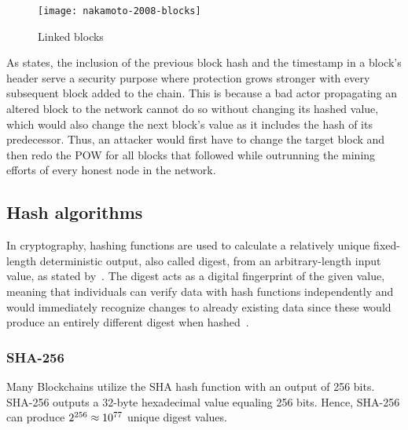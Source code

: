 \begin{figure}[h]
    \texttt{[image: nakamoto-2008-blocks]}
    \caption[Linked blocks]{Linked blocks~\autocite{nakamoto_bitcoin_2008}}
    \label{fig:prev-block-hash}
\end{figure}

As \textcite[2-3]{nakamoto_bitcoin_2008} states, the inclusion of the previous block hash and the timestamp in a block's header serve a security purpose where protection grows stronger with every subsequent block added to the chain.
This is because a bad actor propagating an altered block to the network cannot do so without changing its hashed value, which would also change the next block's value as it includes the hash of its predecessor.
Thus, an attacker would first have to change the target block and then redo the \gls{POW} for all blocks that followed while outrunning the mining efforts of every honest node in the network.

\subsection{Hash algorithms}\label{subsec:hash-algorithms}

In cryptography, hashing functions are used to calculate a relatively unique fixed-length deterministic output, also called digest, from an arbitrary-length input value, as stated by~\textcite[188]{antonopoulos_mastering_2017}.
The digest acts as a digital fingerprint of the given value, meaning that individuals can verify data with hash functions independently and would immediately recognize changes to already existing data since these would produce an entirely different digest when hashed~\autocites[188-189]{antonopoulos_mastering_2017}[7]{yaga_blockchain_2018}.

\subsubsection{SHA-256}
Many \glspl{Blockchain} utilize the \gls{SHA} hash function with an output of 256 bits.
SHA-256 outputs a 32-byte hexadecimal value equaling 256 bits.
Hence, SHA-256 can produce \begin{math}2\textsuperscript{256}\approx10\textsuperscript{77}\end{math} unique digest values.


